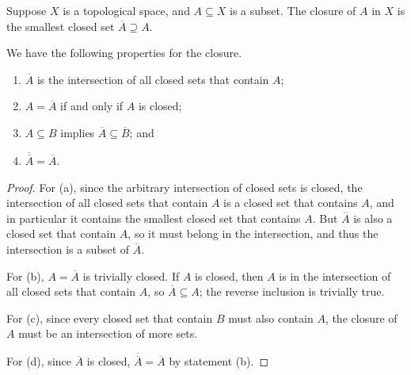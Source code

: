 \begin{definition}
    Suppose \(X\) is a topological space, and \(A \subseteq X\) is a subset.
    The closure of \(A\) in \(X\) is the smallest closed set \(\overline{A} \supseteq A\).
\end{definition}
\begin{proposition}\label{prop:closure-prop}
    We have the following properties for the closure.
    \begin{enumerate}[label={(\alph*)}, itemsep=0mm]
        \item \(\overline{A}\) is the intersection of all closed sets that contain \(A\);
        \item \(A = \overline{A}\) if and only if \(A\) is closed;
        \item \(A \subseteq B\) implies \(\overline{A} \subseteq \overline{B}\); and
        \item \(\overline{\overline{A}} = \overline{A}\).
    \end{enumerate}
\end{proposition}
\begin{proof}
    For (a), since the arbitrary intersection of closed sets is closed,
    the intersection of all closed sets that contain \(A\) is a closed set that contains \(A\),
    and in particular it contains the smallest closed set that contains \(A\).
    But \(\overline{A}\) is also a closed set that contain \(A\),
    so it must belong in the intersection, and thus the intersection is a subset of \(\overline{A}\).

    For (b), \(A = \overline{A}\) is trivially closed.
    If \(A\) is closed, then \(A\) is in the intersection of all closed sets that contain \(A\),
    so \(\overline{A} \subseteq A\);
    the reverse inclusion is trivially true.

    For (c), since every closed set that contain \(B\) must also contain \(A\),
    the closure of \(A\) must be an intersection of more sets.

    For (d), since \(\overline{A}\) is closed, \(\overline{\overline{A}} = \overline{A}\) by statement (b).
\end{proof}

